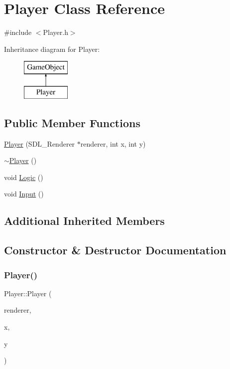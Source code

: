 \hypertarget{class_player}{}\section{Player Class Reference}
\label{class_player}


{\ttfamily \#include $<$Player.\+h$>$}

Inheritance diagram for Player\+:\begin{figure}[H]
\begin{center}
\leavevmode
\includegraphics[height=2.000000cm]{class_player}
\end{center}
\end{figure}
\subsection*{Public Member Functions}
\begin{DoxyCompactItemize}
\item 
\mbox{\hyperlink{class_player_a753df4f66aa114c0789ba730199e4a01}{Player}} (S\+D\+L\+\_\+\+Renderer $\ast$renderer, int x, int y)
\item 
\mbox{\hyperlink{class_player_a749d2c00e1fe0f5c2746f7505a58c062}{$\sim$\+Player}} ()
\item 
void \mbox{\hyperlink{class_player_ae30c8d49de94ee8c73ed6ab6315a2854}{Logic}} ()
\item 
void \mbox{\hyperlink{class_player_a65a76094cff6f149d5847d2110fe443d}{Input}} ()
\end{DoxyCompactItemize}
\subsection*{Additional Inherited Members}


\subsection{Constructor \& Destructor Documentation}
\mbox{\label{class_player_a753df4f66aa114c0789ba730199e4a01}} 
\subsubsection{\texorpdfstring{Player()}{Player()}}
{\footnotesize\ttfamily Player\+::\+Player (\begin{DoxyParamCaption}\item[{S\+D\+L\+\_\+\+Renderer $\ast$}]{renderer,  }\item[{int}]{x,  }\item[{int}]{y }\end{DoxyParamCaption})}

